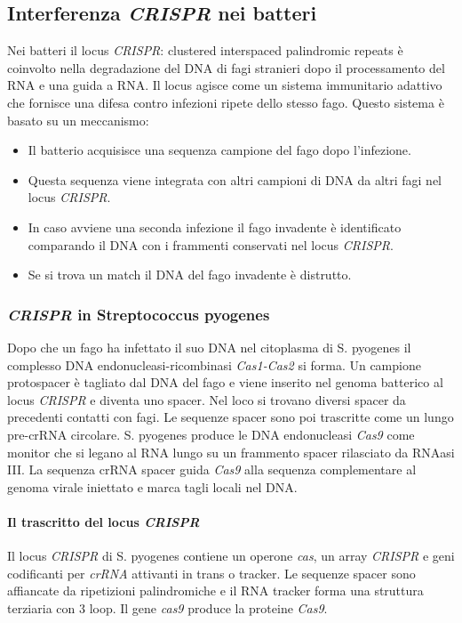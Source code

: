 \subsection{Interferenza \emph{CRISPR} nei batteri}
Nei batteri il locus \emph{CRISPR}: clustered interspaced palindromic repeats \`e coinvolto nella degradazione del DNA di  fagi stranieri dopo il processamento del RNA e una guida 
a RNA. Il locus agisce come un sistema immunitario adattivo che fornisce una difesa contro infezioni ripete dello stesso fago. Questo sistema \`e basato su un meccanismo:
\begin{itemize}
	\item Il batterio acquisisce una sequenza campione del fago dopo l'infezione.
	\item Questa sequenza viene integrata con altri campioni di DNA da altri fagi nel locus \emph{CRISPR}.
	\item In caso avviene una seconda infezione il fago invadente \`e identificato comparando il DNA con i frammenti conservati nel locus \emph{CRISPR}.
	\item Se si trova un match il DNA del fago invadente \`e distrutto.
\end{itemize}
\subsubsection{\emph{CRISPR} in Streptococcus pyogenes}
Dopo che un fago ha infettato il suo DNA nel citoplasma di S. pyogenes il complesso DNA endonucleasi-ricombinasi \emph{Cas1-Cas2} si forma. Un campione protospacer \`e tagliato dal
DNA del fago e viene inserito nel genoma batterico al locus \emph{CRISPR} e diventa uno spacer. Nel loco si trovano diversi spacer da precedenti contatti con fagi. Le sequenze 
spacer sono poi trascritte come un lungo pre-crRNA circolare. S. pyogenes produce le DNA endonucleasi \emph{Cas9} come monitor che si legano al RNA lungo su un frammento spacer
rilasciato da RNAasi III. La sequenza crRNA spacer guida \emph{Cas9} alla sequenza complementare al genoma virale iniettato e marca tagli locali nel DNA. 
\paragraph{Il trascritto del locus \emph{CRISPR}}
Il locus \emph{CRISPR} di S. pyogenes contiene un operone \emph{cas}, un array \emph{CRISPR} e geni codificanti per \emph{crRNA} attivanti in trans o tracker. Le sequenze spacer
sono affiancate da ripetizioni palindromiche e il RNA tracker forma una struttura terziaria con $3$ loop. Il gene \emph{cas9} produce la proteine \emph{Cas9}. 
